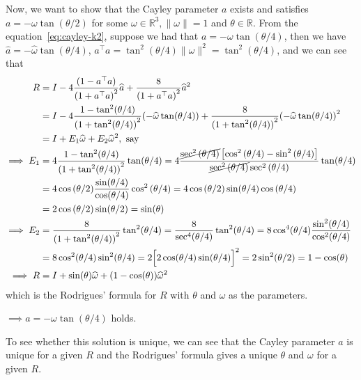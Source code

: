 \clearpage
Now, we want to show that the Cayley parameter \( a \) exists and satisfies \( a = -\omega \tan(\theta / 2) \) for some \( \omega \in \mathbb{R}^{3}, \| \omega \| = 1 \) and \( \theta \in \mathbb{R} \).
From the equation~\eqref{eq:cayley-k2}, suppose we had that \( a = -\omega \tan(\theta / 4) \), then we have \( \widehat{a} = -\widehat{\omega} \tan(\theta / 4) \), \( a^\top a = \tan^{2}(\theta / 4) \| \omega \|^{2} = \tan^{2}(\theta / 4) \), and we can see that
\begin{align*}
    R
     & =
    I - 4 \frac{(1 - a^{\top} a)}{{(1 + a^{\top} a)}^{2}} \widehat{a} + \frac{8}{{(1 + a^{\top} a)}^{2}} \widehat{a}^{2}
    \\ & =
    I - 4 \frac{1 - \tan^{2}(\theta / 4)}{{(1 + \tan^{2}(\theta / 4))}^{2}}{(-\widehat{\omega} \tan(\theta / 4))} + \frac{8}{{(1 + \tan^{2}(\theta / 4))}^{2}}{(-\widehat{\omega} \tan(\theta / 4))}^{2}
    \\ & =
    I + E_1 \widehat{\omega} + E_2 \widehat{\omega}^{2}, \text{ say}
    \\
    \implies
    E_1
     & =
    4 \frac{1 - \tan^{2}(\theta / 4)}{{(1 + \tan^{2}(\theta / 4))}^{2}} \tan(\theta / 4)
    =
    4
    \frac{ \cancel{\sec^{2}{(\theta / 4)}} \left[ \cos^{2}{(\theta / 4)} - \sin^{2}{(\theta / 4)} \right] }{ \cancel{\sec^{2}{(\theta / 4)}} \sec^{2}{(\theta / 4)} }
    \tan(\theta / 4)
    \\ & =
    4 \cos{(\theta / 2)} \frac{\sin(\theta / 4)}{\cos(\theta / 4)} \cos^{2}{(\theta / 4)}
    =
    4 \cos{(\theta / 2)} \sin(\theta / 4) \cos{(\theta / 4)}
    \\ & =
    2 \cos{(\theta / 2)} \sin(\theta / 2)
    =
    \sin(\theta)
    \\
    \implies
    E_2
     & =
    \frac{8}{{(1 + \tan^{2}(\theta / 4))}^{2}} \tan^{2}(\theta / 4)
    =
    \frac{8}{{\sec^{4}(\theta / 4)}} \tan^{2}(\theta / 4)
    =
    8 \cos^{4}(\theta / 4) \frac{\sin^{2}(\theta / 4)}{\cos^{2}(\theta / 4)}
    \\ & =
    8 \cos^{2}(\theta / 4) \sin^{2}(\theta / 4)
    =
    2 {\Big[ 2 \cos(\theta / 4) \sin(\theta / 4) \Big]}^{2}
    =
    2 \sin^{2}(\theta / 2)
    =
    1 - \cos(\theta)
    \\
    \implies
    R
     & =
    I + \sin(\theta) \widehat{\omega} + (1 - \cos(\theta)) \widehat{\omega}^{2}
\end{align*}
which is the Rodrigues' formula for \( R \) with \( \theta \) and \( \omega \) as the parameters.

\( \implies \boxed{a = -\omega \tan(\theta / 4)} \) holds.

To see whether this solution is unique, we can see that the Cayley parameter \( a \) is unique for a given \( R \) and the Rodrigues' formula gives a unique \( \theta \) and \( \omega \) for a given \( R \).
